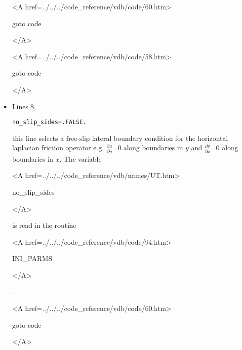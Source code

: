 \begin{itemize}
{\bf
\begin{rawhtml} <A href=../../../code_reference/vdb/code/60.htm> \end{rawhtml}
goto code
\begin{rawhtml} </A>\end{rawhtml}
}

{\bf
\begin{rawhtml} <A href=../../../code_reference/vdb/code/58.htm> \end{rawhtml}
goto code
\begin{rawhtml} </A>\end{rawhtml}
}

\item Lines 8,
\begin{verbatim}
no_slip_sides=.FALSE.
\end{verbatim}
this line selects a free-slip lateral boundary condition for
the horizontal laplacian friction operator 
e.g. $\frac{\partial u}{\partial y}$=0 along boundaries in $y$ and
$\frac{\partial v}{\partial x}$=0 along boundaries in $x$.
The variable
{\bf
\begin{rawhtml} <A href=../../../code_reference/vdb/names/UT.htm> \end{rawhtml}
no\_slip\_sides
\begin{rawhtml} </A>\end{rawhtml}
}
is read in the routine
{\it
\begin{rawhtml} <A href=../../../code_reference/vdb/code/94.htm> \end{rawhtml}
INI\_PARMS
\begin{rawhtml} </A>\end{rawhtml}
}.


{\bf
\begin{rawhtml} <A href=../../../code_reference/vdb/code/60.htm> \end{rawhtml}
goto code
\begin{rawhtml} </A>\end{rawhtml}
}


\end{itemize}
